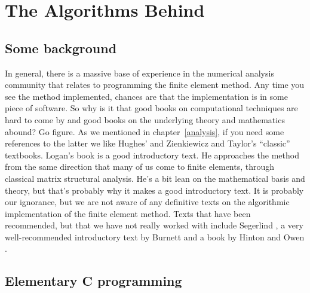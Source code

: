 
\newpage{\pagestyle{empty}\cleardoublepage}

\chapter{The Algorithms Behind \felt{}}
\label{algorithm}

\section{Some background}
In general, there is a massive base of experience in the numerical analysis 
community that relates to programming the finite element method.
Any time you see the method implemented, chances are that the implementation
is in some piece of software. So why is it that good books on computational
techniques are hard to come by and good books on the underlying theory
and mathematics abound?  Go figure.  
As we mentioned in chapter~\ref{analysis},
if you need some references to the latter we like Hughes' \cite{hughes:fem}
and Zienkiewicz and Taylor's \cite{zienk:taylor:fem} ``classic'' textbooks.
Logan's \cite{logan:fem} book is a good introductory text.  He
approaches the method from the same direction that many of us come to finite
elements, through classical matrix structural analysis.  He's a bit lean
on the mathematical basis and theory, but that's probably why it makes a
good introductory text.  It is probably our ignorance, but we are not aware of 
any definitive texts on the algorithmic implementation of the finite element 
method.  Texts that have been recommended, but that we have not really
worked with include Segerlind \cite{segerlind:fea}, a very 
well-recommended introductory text by Burnett \cite{burnett:fea} and a book by
Hinton and Owen \cite{hinton:fep}.  

\section{Elementary C programming}
\label{algorithm.c}

